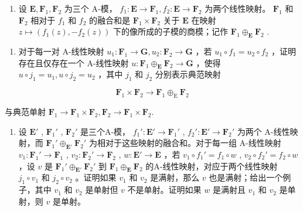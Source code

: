 \begin{enumerate}
\def\labelenumi{\arabic{enumi}.}
\setcounter{enumi}{4}
\tightlist
\item
  设 \(\mathbf{E}, \mathbf{F}_1, \mathbf{F}_2\) 为三个 A-模， \(f_1: \mathbf{E} \to \mathbf{F}_1, f_2: \mathbf{E} \to \mathbf{F}_2\) 为两个线性映射。 \(\mathbf{F}_1\) 和 \(\mathbf{F}_2\) 相对于 \(f_1\) 和 \(f_2\) 的融合和是 \(\mathbf{F}_1 \times \mathbf{F}_2\) 关于 \(\mathbf{E}\) 在映射 \(z \mapsto (f_1(z), -f_2(z))\) 下的像所成的子模的商模；记作 \(\mathbf{F}_1 \oplus_{\mathbf{E}} \mathbf{F}_2\) .
\end{enumerate}

\begin{enumerate}
\def\labelenumi{(\alph{enumi})}
\tightlist
\item
  对于每一对 A-线性映射 \(u_{1}: \mathbf{F}_{1} \to \mathbf{G}, u_{2}: \mathbf{F}_{2} \to \mathbf{G}\) ，若 \(u_{1} \circ f_{1} = u_{2} \circ f_{2}\) ，证明存在且仅存在一个 A-线性映射 \(u: \mathbf{F}_{1} \oplus_{\mathbf{E}} \mathbf{F}_{2} \to \mathbf{G}\) ，使得 \(u \circ j_{1} = u_{1}, u \circ j_{2} = u_{2}\) ，其中 \(j_{1}\) 和 \(j_{2}\) 分别表示典范映射
\end{enumerate}

\[
\mathbf {F} _ {1} \times \mathbf {F} _ {2} \rightarrow \mathbf {F} _ {1} \oplus_ {\mathrm{E}} \mathbf {F} _ {2}
\]

与典范单射 \(\mathbf{F}_1\to \mathbf{F}_1\times \mathbf{F}_2,\mathbf{F}_2\rightarrow \mathbf{F}_1\times \mathbf{F}_2.\)

\begin{enumerate}
\def\labelenumi{(\alph{enumi})}
\setcounter{enumi}{1}
\tightlist
\item
  设 \(\mathbf{E}'\) , \(\mathbf{F}_1'\) , \(\mathbf{F}_2'\) 是三个A-模， \(f_1': \mathbf{E}' \to \mathbf{F}_1'\) , \(f_2': \mathbf{E}' \to \mathbf{F}_2'\) 为两个 A-线性映射，而 \(\mathbf{F}_1' \oplus_{\mathbf{E}'} \mathbf{F}_2'\) 为相对于这些映射的融合和。对于每一组 A-线性映射 \(v_1: \mathbf{F}_1' \to \mathbf{F}_1\) , \(v_2: \mathbf{F}_2' \to \mathbf{F}_2\) , \(w: \mathbf{E}' \to \mathbf{E}\) ，若 \(v_1 \circ f_1' = f_1 \circ w\) , \(v_2 \circ f_2' = f_2 \circ w\) ，设 \(v\) 是 \(\mathbf{F}_1' \oplus_{\mathbf{E}'} \mathbf{F}_2'\) 到 \(\mathbf{F}_1 \oplus_{\mathbf{E}} \mathbf{F}_2\) 的A-线性映射，对应于两个线性映射 \(j_1 \circ v_1\) 和 \(j_2 \circ v_2\) 。证明如果 \(v_1\) 和 \(v_2\) 是满射，那么 \(v\) 也是满射；给出一个例子，其中 \(v_1\) 和 \(v_2\) 是单射但 \(v\) 不是单射。证明如果 \(w\) 是满射且 \(v_1\) 和 \(v_2\) 是单射，则 \(v\) 是单射。
\end{enumerate}

